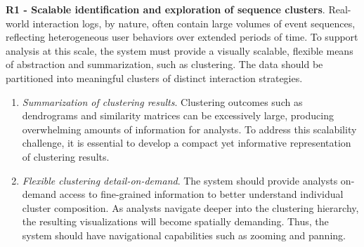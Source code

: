 \documentclass[preprint,journal]{vgtc}            %
\begin{document}
\noindent 
\textbf{R1 - Scalable identification and exploration of sequence clusters}. 
Real-world interaction logs, by nature, often contain large volumes of event sequences, reflecting heterogeneous user behaviors over extended periods of time. 
To support analysis at this scale, the system must provide a visually scalable, flexible means of abstraction and summarization, such as clustering. The data should be partitioned into meaningful clusters of distinct interaction strategies.

\begin{enumerate}[label=T\arabic*., left=0cm, noitemsep, topsep=0pt, parsep=0pt]
    \item \textit{Summarization of clustering results}.
    Clustering outcomes such as dendrograms and similarity matrices can be excessively large, producing overwhelming amounts of information for analysts. 
    To address this scalability challenge, it is essential to develop a compact yet informative representation of clustering results.

    \item \textit{Flexible clustering detail-on-demand}. %
    The system should provide analysts on-demand access to fine-grained information to better understand individual cluster composition.    
    As analysts navigate deeper into the clustering hierarchy, the resulting visualizations will become spatially demanding.
    Thus, the system should have navigational capabilities such as zooming and panning.
\end{enumerate}
\end{document}
